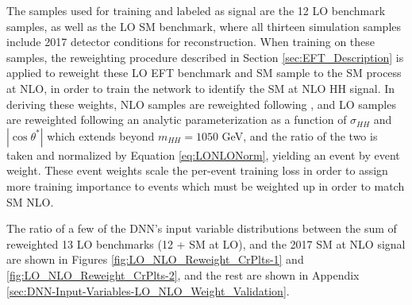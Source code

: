 

The samples used for training and labeled as signal are the 12 LO benchmark samples, as well as the LO SM benchmark, where all thirteen simulation samples include 2017 detector conditions for reconstruction. When training on these 
samples, the reweighting procedure described in Section \ref{sec:EFT_Description}
is applied to reweight these LO EFT benchmark and SM sample to the SM process at NLO, in order to train the network to identify the SM at NLO HH signal. 
In deriving these weights, NLO samples are reweighted following \cite{Buchalla:2018yce}, and LO samples are reweighted 
following an analytic parameterization as a function of $\sigma_{HH}$ and $|\cos{\theta^*}|$ which extends beyond $m_{HH} = 1050$ GeV, and the ratio of the two is taken 
and normalized by Equation \ref{eq:LONLONorm}, yielding an event by event weight. These event weights scale the per-event training loss in order to 
assign more training importance to events which must be weighted up in order to match SM NLO. 

The ratio of a few of the DNN's input variable distributions between the sum of reweighted 13 LO benchmarks (12 + SM at LO), and the 2017 SM at NLO signal are shown in Figures \ref{fig:LO_NLO_Reweight_CrPlts-1} and \ref{fig:LO_NLO_Reweight_CrPlts-2}, and the rest are shown in Appendix \ref{sec:DNN-Input-Variables-LO_NLO_Weight_Validation}.

